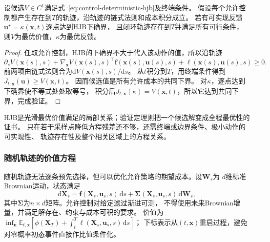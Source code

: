 \begin{theorem}[确定性HJB验证定理]
\label{thm:control-hjb-verification}
设候选$V\in C^1$满足式~\eqref{eq:control-deterministic-hjb}及终端条件。
假设每个允许控制都产生存在到$T$的轨迹，沿轨迹的链式法则和成本积分成立。
若有可实现反馈$\bm u^\star=\kappa(\bm x,t)$逐点达到HJB下确界，
且闭环轨迹存在到$T$并满足所有可行条件，则$V$为最优价值，$\kappa$为最优反馈。
\end{theorem}
\begin{proof}
任取允许控制，HJB的下确界不大于代入该动作的值，所以沿轨迹
\[
  \partial_sV(\bm x(s),s)+
  \nabla_{\bm x}V(\bm x(s),s)^\top
    \bm f(\bm x(s),\bm u(s),s)
  +\ell(\bm x(s),\bm u(s),s)\geq0.
\]
前两项由链式法则合为$\mathrm dV(\bm x(s),s)/\mathrm ds$。
从$t$积分到$T$，用终端条件得到$J_{t,\bm x}(\bm u)\geq V(\bm x,t)$。
因而候选值是所有允许成本的共同下界。
对$\kappa$，逐点达到下确界使不等式处处取等号，
积分后$J_{t,\bm x}(\kappa)=V(\bm x,t)$，所以它达到共同下界，完成验证。
\end{proof}
HJB是光滑最优价值满足的局部关系；验证定理则把一个候选解变成全程最优性的证书。
只在若干采样点降低方程残差还不够，还需终端或边界条件、极小动作的可实现性、
轨迹存在性及整个相关区域上的方程关系。

\subsubsection{随机轨迹的价值方程}

随机轨迹无法逐条预先选择，但可以优化允许策略的期望成本。设$\bm W_s$为
$d$维标准Brownian运动，状态满足
\begin{equation}
  \mathrm d\bm X_s=\bm f(\bm X_s,\bm u_s,s)\,\mathrm ds
    +\bm\Sigma(\bm X_s,\bm u_s,s)\,\mathrm d\bm W_s,
  \label{eq:control-stochastic-dynamics}
\end{equation}
其中$\bm\Sigma$为$n\times d$矩阵。允许控制对给定滤过渐进可测，
不得使用未来Brownian增量，并满足解存在、约束与成本可积的要求。
价值为
$\inf_{\bm u}\mathbb E_{t,\bm x}[
\phi(\bm X_T)+\int_t^T\ell(\bm X_s,\bm u_s,s)\,\mathrm ds]$；
下标表示从$(t,\bm x)$重启过程，避免对零概率初态事件直接作比值条件化。

